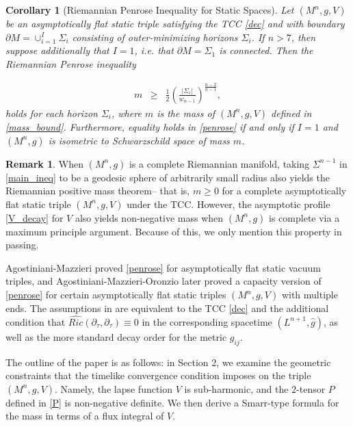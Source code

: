 \documentclass[12pt]{amsart}
\newtheorem{corollary}[theorem]{Corollary}
\theoremstyle{definition}
\newtheorem{remark}[theorem]{Remark}
\numberwithin{equation}{section}
\begin{document}
\begin{corollary} [Riemannian Penrose Inequality for Static Spaces] \label{riem_penrose}
Let $(M^{n},g,V)$ be an asymptotically flat static triple satisfying the TCC \eqref{dec} and with boundary $\partial M = \cup_{i=1}^{I}\Sigma_{i}$ consisting of outer-minimizing horizons $\Sigma_{i}$. If $n > 7$, then suppose additionally that $I=1$, i.e. that $\partial M=\Sigma_{1}$ is connected.
Then the Riemannian Penrose inequality

\begin{eqnarray}
    m &\geq& \frac{1}{2} \left( \frac{|\Sigma_{i}|}{w_{n-1}} \right)^{\frac{n-2}{n-1}}, \label{penrose}
\end{eqnarray}
holds for each horizon $\Sigma_{i}$, where $m$ is the mass of $(M^{n},g,V)$ defined in \eqref{mass_bound}. Furthermore, equality holds in \eqref{penrose} if and only if $I=1$ and $(M^{n},g)$ is isometric to Schwarzschild space of mass $m$.
\end{corollary}
\begin{remark}
When $(M^{n},g)$ is a complete Riemannian manifold, taking $\Sigma^{n-1}$ in \eqref{main_ineq} to be a geodesic sphere of arbitrarily small radius also yields the Riemannian positive mass theorem-- that is, $m \geq 0$ for a complete asymptotically flat static triple $(M^{n},g,V)$ under the TCC. However, the asymptotic profile \eqref{V_decay} for $V$ also yields non-negative mass when $(M^{n},g)$ is complete via a maximum principle argument. Because of this, we only mention this property in passing.
\end{remark}
Agostiniani-Mazzieri \cite{AM15} proved \eqref{penrose} for asymptotically flat static vacuum triples, and Agostiniani-Mazzieri-Oronzio \cite{AMO20} later proved a capacity version of \eqref{penrose} for certain asymptotically flat static triples $(M^{n},g,V)$ with multiple ends. The assumptions in \cite{AMO20} are equivalent to the TCC \eqref{dec} and the additional condition that $\widehat{Ric}(\partial_{\tau},\partial_{\tau}) \equiv 0$ in the corresponding spacetime $(L^{n+1},\widehat{g})$, as well as the more standard decay order for the metric $g_{ij}$. 
 
The outline of the paper is as follows: in Section 2, we examine the geometric constraints that the timelike convergence condition imposes on the triple $(M^{n},g,V)$. Namely, the lapse function $V$ is sub-harmonic, and the $2$-tensor $P$ defined in \eqref{P} is non-negative definite. We then derive a Smarr-type formula for the mass in terms of a flux integral of $V$.
\end{document}
